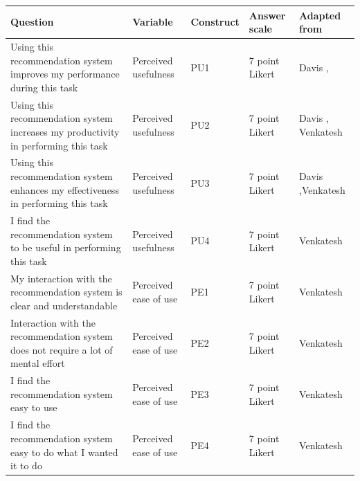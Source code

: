 \documentclass[a4paper,12pt]{article}
\newcommand{\citeyearonly}[1]{\citeyearpar{#1}}
\begin{document}
\section{}\label{appendix:userControlExperimentQuestionnaire}
\clearpage
\begin{table}
    \centering
    \small{
    \begin{tabular}{|p{7cm}|l|p{2cm}|p{3cm}|p{3cm}|}
    \hline
        \textbf{Question} & \textbf{Variable} & \textbf{Construct} & \textbf{Answer scale} & \textbf{Adapted from} \\ \hline
        Using this recommendation system improves my performance  during this task & Perceived usefulness & PU1 & 7 point Likert & Davis \citeyearonly{davisPerceivedUsefulnessPerceived1989}, \citep{venkateshDeterminantsPerceivedEase2000} \\ \hline
        Using this recommendation system increases my productivity in performing this task & Perceived usefulness & PU2 & 7 point Likert & Davis \citeyearonly{davisPerceivedUsefulnessPerceived1989}, Venkatesh \citeyearonly{venkateshDeterminantsPerceivedEase2000}\\ \hline
        Using this recommendation system enhances my effectiveness in performing this task & Perceived usefulness & PU3 & 7 point Likert & Davis \citeyearonly{davisPerceivedUsefulnessPerceived1989},Venkatesh \citeyearonly{venkateshDeterminantsPerceivedEase2000} \\ \hline
        I find the recommendation system to be useful in performing this task & Perceived usefulness & PU4 & 7 point Likert & Venkatesh \citeyearonly{venkateshDeterminantsPerceivedEase2000} \\ \hline
        My interaction with the recommendation system is clear and understandable & Perceived ease of use & PE1 & 7 point Likert & Venkatesh \citeyearonly{venkateshDeterminantsPerceivedEase2000}\\ \hline
        Interaction with the recommendation system does not require a lot of mental effort & Perceived ease of use & PE2 & 7 point Likert & Venkatesh \citeyearonly{venkateshDeterminantsPerceivedEase2000} \\ \hline
        I find the recommendation system easy to use & Perceived ease of use & PE3 & 7 point Likert & Venkatesh \citeyearonly{venkateshDeterminantsPerceivedEase2000} \\ \hline
        I find the recommendation system easy to do what I wanted it to do & Perceived ease of use & PE4 & 7 point Likert & Venkatesh \citeyearonly{venkateshDeterminantsPerceivedEase2000} \\ \hline

\end{tabular}}
\end{table}
\end{document}
